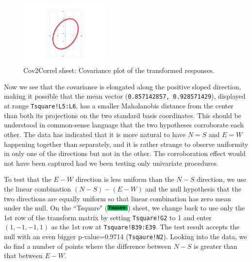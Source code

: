 \documentclass[article]{jss}
\newcommand{\shtTsquare}{``Tsquare" (\includegraphics[height=8pt, keepaspectratio=true]{TsquareSheetTab_png}) }
\begin{document}
\begin{enumerate}
                \begin{figure}
                        \includegraphics[width=130pt,keepaspectratio=true]{img/Cov2Correl_PlotCov}
                        \centering\protect\caption{Cov2Correl sheet: Covariance plot of the transformed responses.}\label{fig:Cov2Correl_PlotCov}
                \end{figure}
                
                
        \end{enumerate}
        
        
        
        Now we see that the covariance is elongated along the positive sloped direction, making it possible that the mean vector (\texttt{0.857142857, 0.928571429}), displayed at range \texttt{Tsquare!L5:L6}, has a smaller Mahalanobis distance from the center than both its projections on the two standard basis coordinates. This should be understood in common-sense language that the two hypotheses corroborate each other. The data has indicated that it is more natural to have $N=S$ and $E=W$ happening together than separately, and it is rather strange to observe uniformity in only one of the directions but not in the other. The corroboration effect would not have been captured had we been testing only univariate procedures.
        
        
        To test that the $E-W$ direction is less uniform than the $N-S$ direction, we use the linear combination $(N-S)-(E-W)$ and the null hypothesis that the two directions are equally uniform so that linear combination has zero mean under the null. On the \shtTsquare sheet, we change back to use only the 1st row of the transform matrix by setting \texttt{Tsquare!G2} to 1 and enter $(1,-1,-1,1)$ as the 1st row at \texttt{Tsquare!B39:E39}. The test result accepts the null with an even bigger p-value=0.9714 (\texttt{Tsqaure!N2}). Looking into the data, we do find a number of points where the difference between $N-S$ is greater than that between $E-W$.
        
\end{document}
